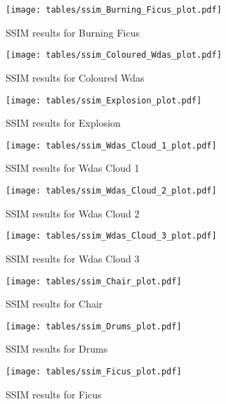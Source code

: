 \begin{figure}[h!]
\centering
\texttt{[image: tables/ssim\_Burning\_Ficus\_plot.pdf]}
\caption{SSIM results for Burning Ficus}
\label{fig:ap_ssim_Burning Ficus_plot}
\end{figure}

\begin{figure}[h!]
\centering
\texttt{[image: tables/ssim\_Coloured\_Wdas\_plot.pdf]}
\caption{SSIM results for Coloured Wdas}
\label{fig:ap_ssim_Coloured Wdas_plot}
\end{figure}

\begin{figure}[h!]
\centering
\texttt{[image: tables/ssim\_Explosion\_plot.pdf]}
\caption{SSIM results for Explosion}
\label{fig:ap_ssim_Explosion_plot}
\end{figure}

\begin{figure}[h!]
\centering
\texttt{[image: tables/ssim\_Wdas\_Cloud\_1\_plot.pdf]}
\caption{SSIM results for Wdas Cloud 1}
\label{fig:ap_ssim_Wdas Cloud 1_plot}
\end{figure}

\begin{figure}[h!]
\centering
\texttt{[image: tables/ssim\_Wdas\_Cloud\_2\_plot.pdf]}
\caption{SSIM results for Wdas Cloud 2}
\label{fig:ap_ssim_Wdas Cloud 2_plot}
\end{figure}

\begin{figure}[h!]
\centering
\texttt{[image: tables/ssim\_Wdas\_Cloud\_3\_plot.pdf]}
\caption{SSIM results for Wdas Cloud 3}
\label{fig:ap_ssim_Wdas Cloud 3_plot}
\end{figure}

\begin{figure}[h!]
\centering
\texttt{[image: tables/ssim\_Chair\_plot.pdf]}
\caption{SSIM results for Chair}
\label{fig:ap_ssim_Chair_plot}
\end{figure}

\begin{figure}[h!]
\centering
\texttt{[image: tables/ssim\_Drums\_plot.pdf]}
\caption{SSIM results for Drums}
\label{fig:ap_ssim_Drums_plot}
\end{figure}

\begin{figure}[h!]
\centering
\texttt{[image: tables/ssim\_Ficus\_plot.pdf]}
\caption{SSIM results for Ficus}
\label{fig:ap_ssim_Ficus_plot}
\end{figure}

